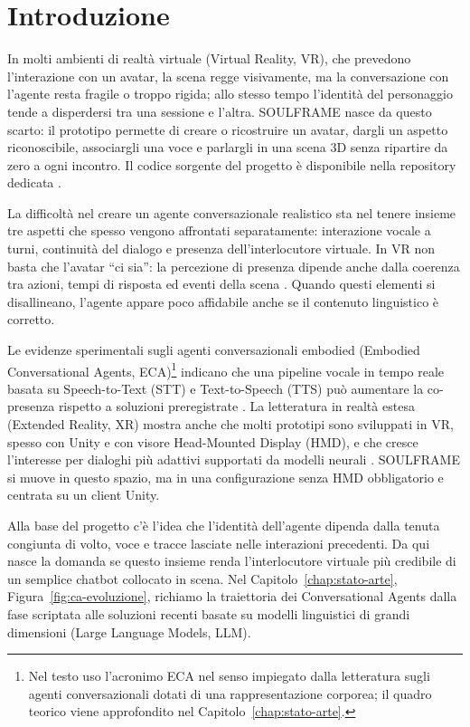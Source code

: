 \chapter{Introduzione}\label{chapintroduzione}

In molti ambienti di realtà virtuale (Virtual Reality, VR), che prevedono l'interazione con un avatar, la scena regge visivamente, ma la conversazione con l'agente resta fragile o troppo rigida; allo stesso tempo l'identità del personaggio tende a disperdersi tra una sessione e l'altra. SOULFRAME nasce da questo scarto: il prototipo permette di creare o ricostruire un avatar, dargli un aspetto riconoscibile, associargli una voce e parlargli in una scena 3D senza ripartire da zero a ogni incontro. Il codice sorgente del progetto è disponibile nella repository dedicata \cite{SOULFRAMERepo}.

La difficoltà nel creare un agente conversazionale realistico sta nel tenere insieme tre aspetti che spesso vengono affrontati separatamente: interazione vocale a turni, continuità del dialogo e presenza dell'interlocutore virtuale. In VR non basta che l'avatar ``ci sia'': la percezione di presenza dipende anche dalla coerenza tra azioni, tempi di risposta ed eventi della scena \cite{Slater2016VR}. Quando questi elementi si disallineano, l'agente appare poco affidabile anche se il contenuto linguistico è corretto.

Le evidenze sperimentali sugli agenti conversazionali embodied (Embodied Conversational Agents, ECA)\footnote{Nel testo uso l'acronimo ECA nel senso impiegato dalla letteratura sugli agenti conversazionali dotati di una rappresentazione corporea; il quadro teorico viene approfondito nel Capitolo~\ref{chap:stato-arte}.} indicano che una pipeline vocale in tempo reale basata su Speech-to-Text (STT) e Text-to-Speech (TTS) può aumentare la co-presenza rispetto a soluzioni preregistrate \cite{Kan2023ECA_Training}. La letteratura in realtà estesa (Extended Reality, XR) mostra anche che molti prototipi sono sviluppati in VR, spesso con Unity e con visore Head-Mounted Display (HMD), e che cresce l'interesse per dialoghi più adattivi supportati da modelli neurali \cite{Yang2025ECA_XR}. SOULFRAME si muove in questo spazio, ma in una configurazione senza HMD obbligatorio e centrata su un client Unity.

Alla base del progetto c'è l'idea che l'identità dell'agente dipenda dalla tenuta congiunta di volto, voce e tracce lasciate nelle interazioni precedenti. Da qui nasce la domanda se questo insieme renda l'interlocutore virtuale più credibile di un semplice chatbot collocato in scena. Nel Capitolo~\ref{chap:stato-arte}, Figura~\ref{fig:ca-evoluzione}, richiamo la traiettoria dei Conversational Agents dalla fase scriptata alle soluzioni recenti basate su modelli linguistici di grandi dimensioni (Large Language Models, LLM).

